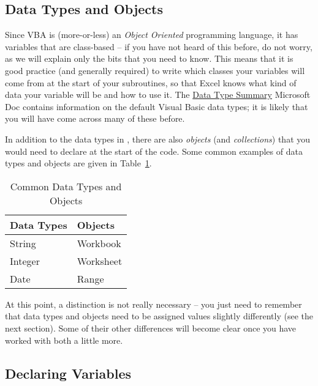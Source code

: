 \documentclass[11pt]{article}%
\begin{document}

\subsection{Data Types and Objects}\label{subsec:DataTypesAndObjects}

Since VBA is (more-or-less) an \textit{Object Oriented} programming language, it has variables that are class-based -- if you have not heard of this before, do not worry, as we will explain only the bits that you need to know. This means that it is good practice (and generally required) to write which classes your variables will come from at the start of your subroutines, so that Excel knows what kind of data your variable will be and how to use it. The \href{https://docs.microsoft.com/en-gb/dotnet/visual-basic/language-reference/data-types/index}{Data Type Summary} Microsoft Doc \cite{DataTypes} contains information on the default Visual Basic data types; it is likely that you will have come across many of these before.

In addition to the data types in \cite{DataTypes}, there are also \textit{objects} (and \textit{collections}) that you would need to declare at the start of the code. Some common examples of data types and objects are given in Table~\ref{tab:DataTypesAndObjects}.

\begin{table}[h]
    \centering
    \begin{tabular}{ll}%
        \textbf{Data Types} & \textbf{Objects} \\\hline
        String     & Workbook \\
        Integer    & Worksheet \\
        Date       & Range \\%
    \end{tabular}
    \caption{Common Data Types and Objects}
    \label{tab:DataTypesAndObjects}
\end{table}

At this point, a distinction is not really necessary -- you just need to remember that data types and objects need to be assigned values slightly differently (see the next section). Some of their other differences will become clear once you have worked with both a little more.


\subsection{Declaring Variables}\label{subsec:DeclaringVariables}
\end{document}

